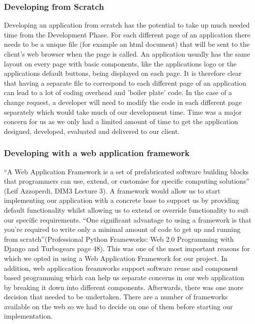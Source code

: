 \documentclass{l3proj}
\begin{document}
\subsubsection{ Developing from Scratch}
Developing an application from scratch has the potential to take up much needed time 
from the Development Phase. For each different page of an application there needs to be 
a unique file (for example an html document) that will be sent to the client's web browser 
when the page is called. An application usually has the same layout on every page with 
basic components, like the applications logo or the applications default buttons, being 
displayed on each page. It is therefore clear that having a separate file to correspond to 
each different page of an application can lead to a lot of coding overhead and 'boiler 
plate' code. In the case of a change request, a developer will need to modify the code in 
each different page separately which would take much of our development time. Time was a major concern for us as we only had a limited amount of time to get the application designed, developed, evaluated and delivered to our client. \subsubsection{Developing with a web application framework}
``A Web Application Framework is a set of prefabricated software building blocks that 
programmers can use, extend, or customise for specific computing solutions'' (Leif 
Azzoperdi, DIM3 Lecture 3). A framework would allow us to start implementing our 
application with a concrete base to support us by providing default functionality whilst 
allowing us to extend or override functionality to suit our specific requirements. ``One 
significant advantage to using a framework is that you're required to write only a 
minimal amount of code to get up and running from scratch''(Professional Python 
Frameworks: Web 2.0 Programming with Django and Turbogears page 48). This was 
one of the most important reasons for which we opted in using a Web Application 
Framework for our project. In addition, web appliccation freamworks support software reuse and component based programming which can help us separate concerns in our web application by breaking it down into different components. Afterwards, there was one more decision that needed to be 
undertaken. There are a number of frameworks available on the web so we had to decide 
on one of them before starting our implementation. 
\end{document}
